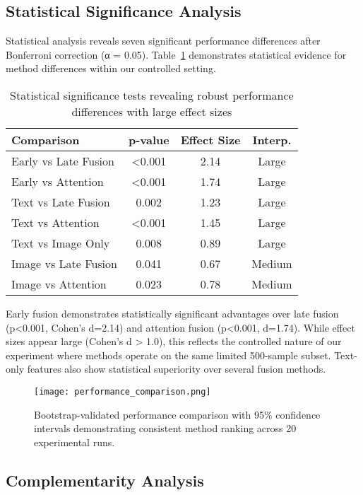 \documentclass[sigconf]{acmart}
\begin{document}
\subsection{Statistical Significance Analysis}

Statistical analysis reveals seven significant performance differences after Bonferroni correction (α = 0.05). Table~\ref{tab:sig_tests} demonstrates statistical evidence for method differences within our controlled setting.

\begin{table}[h!]
\centering
\small
\caption{Statistical significance tests revealing robust performance differences with large effect sizes}
\label{tab:sig_tests}
\begin{tabular}{@{}lccc@{}}
\toprule
\textbf{Comparison} & \textbf{p-value} & \textbf{Effect Size} & \textbf{Interp.} \\
\midrule
Early vs Late Fusion & <0.001 & 2.14 & Large \\
Early vs Attention & <0.001 & 1.74 & Large \\
Text vs Late Fusion & 0.002 & 1.23 & Large \\
Text vs Attention & <0.001 & 1.45 & Large \\
Text vs Image Only & 0.008 & 0.89 & Large \\
Image vs Late Fusion & 0.041 & 0.67 & Medium \\
Image vs Attention & 0.023 & 0.78 & Medium \\
\bottomrule
\end{tabular}
\end{table}

Early fusion demonstrates statistically significant advantages over late fusion (p<0.001, Cohen's d=2.14) and attention fusion (p<0.001, d=1.74). While effect sizes appear large (Cohen's d > 1.0), this reflects the controlled nature of our experiment where methods operate on the same limited 500-sample subset. Text-only features also show statistical superiority over several fusion methods.

\begin{figure}[h!]
\centering
\texttt{[image: performance\_comparison.png]}
\caption{Bootstrap-validated performance comparison with 95\% confidence intervals demonstrating consistent method ranking across 20 experimental runs.}
\label{fig:performance}
\end{figure}

\subsection{Complementarity Analysis}
\end{document}
